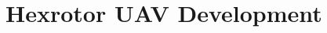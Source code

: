 \documentclass[letterpaper, 10pt, conference]{ieeeconf}
\newcommand{\refeqn}[1]{(\ref{eqn:#1})}
\begin{document}
%
%
%
%
%
%
%		
%

\section{Hexrotor UAV Development}
\label{initTesting}
\end{document}

